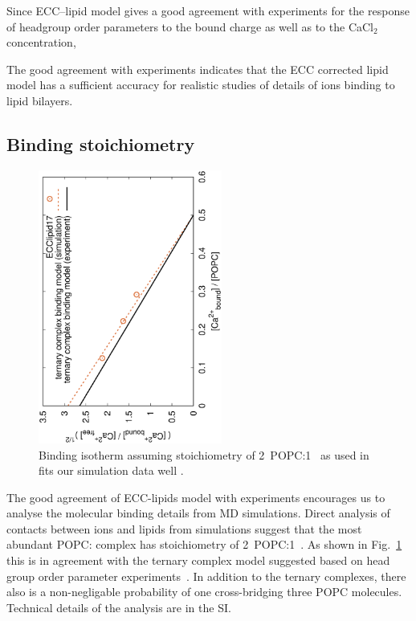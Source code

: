 \documentclass[aip,jcp,twocolumn]{revtex4}
\begin{document}
Since ECC--lipid model gives a good agreement with experiments for the response
of headgroup order parameters to the bound charge as well as to the CaCl$_2$
concentration,

The good agreement with experiments indicates
that the ECC corrected lipid model has a sufficient accuracy for realistic
studies of details of ions binding to lipid bilayers.



\subsection{Binding stoichiometry}

\begin{figure}[]
  \centering
  \includegraphics[height=9.0cm,angle=-90]{../Fig/bound-CAs_conc-eccl17.eps}
  \caption{\label{fig:cacl-bind}
    Binding isotherm assuming stoichiometry of 2~POPC:1~ as used in \cite{altenbach84} fits our simulation data well .
    }
\end{figure}

The good agreement of ECC-lipids model with experiments encourages us to analyse the
molecular binding details from MD simulations. Direct analysis of contacts between ions and
lipids from simulations suggest that the most abundant POPC: complex 
has stoichiometry of 2~POPC:1~.
As shown in Fig.~\ref{fig:cacl-bind} this is in agreement
with the ternary complex model suggested based on head group order parameter
experiments~\cite{altenbach84}.
In addition to the ternary complexes, there also is a non-negligable probability
of one  cross-bridging three POPC molecules.
Technical details of the analysis are in the SI. 
\end{document}
